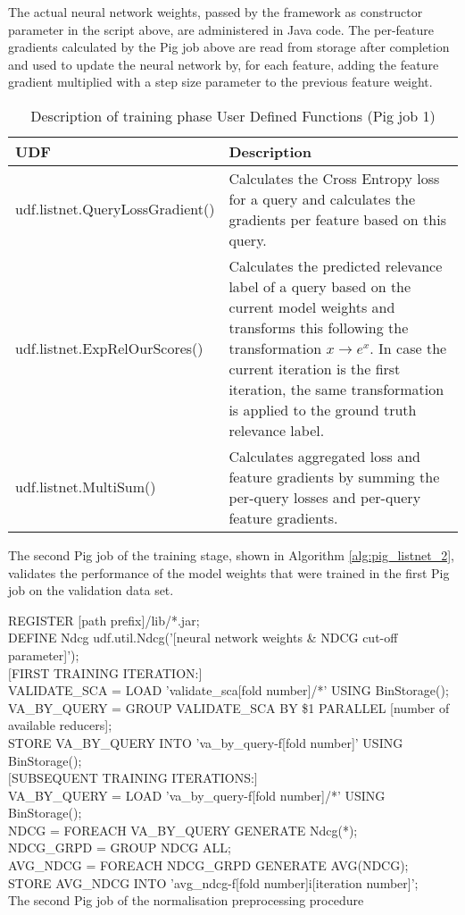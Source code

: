 The actual neural network weights, passed by the framework as constructor parameter in the script above, are administered in Java code. The per-feature gradients calculated by the Pig job above are read from storage after completion and used to update the neural network by, for each feature, adding the feature gradient multiplied with a step size parameter to the previous feature weight.

\begin{table}
\centering
\begin{tabular}{p{6cm}p{7cm}}\toprule
UDF & Description \\
\midrule
udf.listnet.QueryLossGradient() & Calculates the Cross Entropy loss for a query and calculates the gradients per feature based on this query.\\
udf.listnet.ExpRelOurScores() & Calculates the predicted relevance label of a query based on the current model weights and transforms this following the transformation $x \rightarrow e^{x}$. In case the current iteration is the first iteration, the same transformation is applied to the ground truth relevance label.\\
udf.listnet.MultiSum() & Calculates aggregated loss and feature gradients by summing the per-query losses and per-query feature gradients.\\
\bottomrule
\end{tabular}
\caption{Description of training phase User Defined Functions (Pig job 1)}
\label{tbl:training_udfs_1}
\end{table}

The second Pig job of the training stage, shown in Algorithm \ref{alg:pig_listnet_2}, validates the performance of the model weights that were trained in the first Pig job on the validation data set.\\

\begin{algorithm}
REGISTER [path prefix]/lib/*.jar;\\
DEFINE Ndcg udf.util.Ndcg('[neural network weights \& NDCG cut-off parameter]');\\
$[$FIRST TRAINING ITERATION:$]$\\
\Indp
	VALIDATE\_SCA = LOAD 'validate\_sca[fold number]/*' USING BinStorage();\\
	VA\_BY\_QUERY = GROUP VALIDATE\_SCA BY \$1 PARALLEL [number of available reducers];\\
	STORE VA\_BY\_QUERY INTO 'va\_by\_query-f[fold number]' USING BinStorage();\\
\Indm 
$[$SUBSEQUENT TRAINING ITERATIONS:$]$\\
\Indp
VA\_BY\_QUERY = LOAD 'va\_by\_query-f[fold number]/*' USING BinStorage();\\
\Indm 
NDCG = FOREACH VA\_BY\_QUERY GENERATE Ndcg(*);\\
NDCG\_GRPD = GROUP NDCG ALL;\\
AVG\_NDCG = FOREACH NDCG\_GRPD GENERATE AVG(NDCG);\\
STORE AVG\_NDCG INTO 'avg\_ndcg-f[fold number]i[iteration number]';\\
\caption{The second Pig job of the normalisation preprocessing procedure}
\label{alg:pig_listnet_2}
\end{algorithm}

